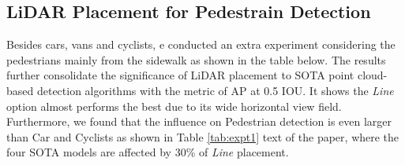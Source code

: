 \documentclass[10pt,twocolumn,letterpaper]{article}
\begin{document}
\subsection{LiDAR Placement for Pedestrain Detection}
Besides cars, vans and cyclists, e conducted an extra experiment considering the pedestrians mainly from the sidewalk as shown in the table below. The results further consolidate the significance of LiDAR placement to SOTA point cloud-based detection algorithms with the metric of AP at 0.5 IOU. It shows the \textit{Line} option almost performs the best due to its wide horizontal view field. Furthermore, we found that the influence on Pedestrian detection is even larger than Car and Cyclists as shown in Table \ref{tab:expt1} text of the paper, where the four SOTA models are affected by 30\% of \textit{Line} placement.
\end{document}
